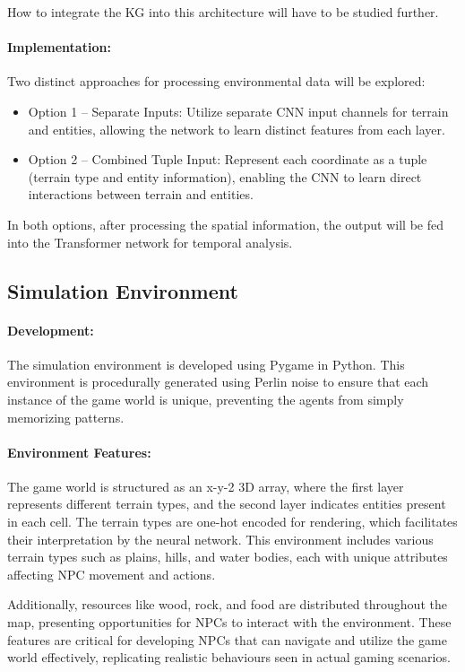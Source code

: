 How to integrate the KG into this architecture will have to be studied further.

\paragraph{Implementation:}
Two distinct approaches for processing environmental data will be explored:
\begin{itemize}
    \item Option 1 – Separate Inputs: Utilize separate CNN input channels for terrain and entities, allowing the network to learn distinct features from each layer.
    \item Option 2 – Combined Tuple Input: Represent each coordinate as a tuple (terrain type and entity information), enabling the CNN to learn direct interactions between terrain and entities.
\end{itemize}
In both options, after processing the spatial information, the output will be fed into the Transformer network for temporal analysis.


\subsection{Simulation Environment}
\paragraph{Development:}
The simulation environment is developed using Pygame in Python. This environment is procedurally generated using Perlin noise to ensure that each instance of the game world is unique, preventing the agents from simply memorizing patterns.

\paragraph{Environment Features:}
The game world is structured as an x-y-2 3D array, where the first layer represents different terrain types, and the second layer indicates entities present in each cell. The terrain types are one-hot encoded for rendering, which facilitates their interpretation by the neural network. This environment includes various terrain types such as plains, hills, and water bodies, each with unique attributes affecting NPC movement and actions. 

Additionally, resources like wood, rock, and food are distributed throughout the map, presenting opportunities for NPCs to interact with the environment. These features are critical for developing NPCs that can navigate and utilize the game world effectively, replicating realistic behaviours seen in actual gaming scenarios.

